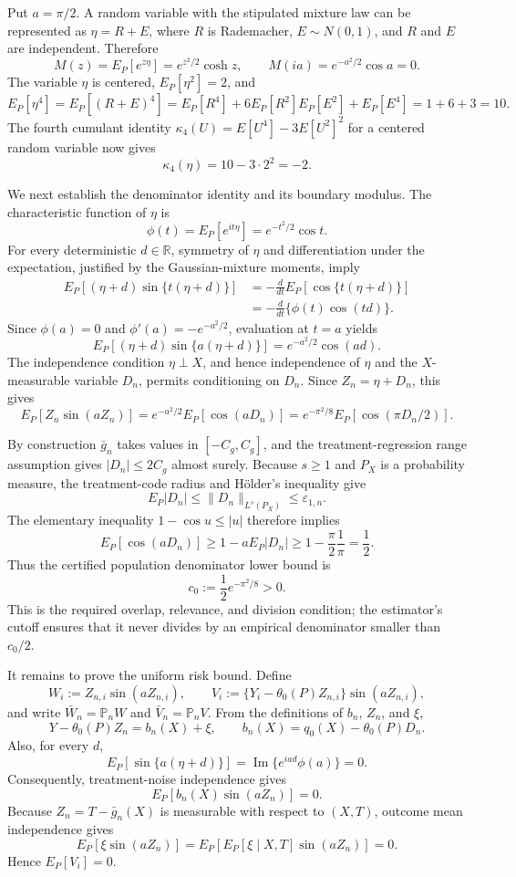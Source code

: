 Put \(a=\pi/2\).  A random variable with the stipulated mixture law can be represented as \(\eta=R+E\), where \(R\) is Rademacher, \(E\sim N(0,1)\), and \(R\) and \(E\) are independent.  Therefore
\[
M(z)=E_P[e^{z\eta}]=e^{z^2/2}\cosh z,
\qquad
M(ia)=e^{-a^2/2}\cos a=0.
\]
The variable \(\eta\) is centered, \(E_P[\eta^2]=2\), and
\[
E_P[\eta^4]
=E_P[(R+E)^4]
=E_P[R^4]+6E_P[R^2]E_P[E^2]+E_P[E^4]
=1+6+3=10.
\]
The fourth cumulant identity \(\kappa_4(U)=E[U^4]-3E[U^2]^2\) for a centered random variable now gives
\[
\kappa_4(\eta)=10-3\cdot 2^2=-2.
\]

We next establish the denominator identity and its boundary modulus.  The characteristic function of \(\eta\) is
\[
\phi(t)=E_P[e^{it\eta}]=e^{-t^2/2}\cos t.
\]
For every deterministic \(d\in\mathbb R\), symmetry of \(\eta\) and differentiation under the expectation, justified by the Gaussian-mixture moments, imply
\[
\begin{aligned}
E_P[(\eta+d)\sin\{t(\eta+d)\}]
&=-\frac{d}{dt}E_P[\cos\{t(\eta+d)\}]\\
&=-\frac{d}{dt}\{\phi(t)\cos(td)\}.
\end{aligned}
\]
Since \(\phi(a)=0\) and \(\phi'(a)=-e^{-a^2/2}\), evaluation at \(t=a\) yields
\[
E_P[(\eta+d)\sin\{a(\eta+d)\}]
=e^{-a^2/2}\cos(ad).
\]
The independence condition \(\eta\perp X\), and hence independence of \(\eta\) and the \(X\)-measurable variable \(D_n\), permits conditioning on \(D_n\).  Since \(Z_n=\eta+D_n\), this gives
\[
E_P[Z_n\sin(aZ_n)]
=e^{-a^2/2}E_P[\cos(aD_n)]
=e^{-\pi^2/8}E_P[\cos(\pi D_n/2)].
\]

By construction \(\bar g_n\) takes values in \([-C_g,C_g]\), and the treatment-regression range assumption gives \(|D_n|\le2C_g\) almost surely.  Because \(s\ge1\) and \(P_X\) is a probability measure, the treatment-code radius and H\"older's inequality give
\[
E_P|D_n|\le \|D_n\|_{L^s(P_X)}\le\varepsilon_{1,n}.
\]
The elementary inequality \(1-\cos u\le |u|\) therefore implies
\[
E_P[\cos(aD_n)]
\ge1-aE_P|D_n|
\ge1-\frac{\pi}{2}\frac1\pi
=\frac12.
\]
Thus the certified population denominator lower bound is
\[
c_0:=\frac12e^{-\pi^2/8}>0.
\]
This is the required overlap, relevance, and division condition; the estimator's cutoff ensures that it never divides by an empirical denominator smaller than \(c_0/2\).

It remains to prove the uniform risk bound.  Define
\[
W_i:=Z_{n,i}\sin(aZ_{n,i}),
\qquad
V_i:=\{Y_i-\theta_0(P)Z_{n,i}\}\sin(aZ_{n,i}),
\]
and write \(\bar W_n=\mathbb P_nW\) and \(\bar V_n=\mathbb P_nV\).  From the definitions of \(b_n\), \(Z_n\), and \(\xi\),
\[
Y-\theta_0(P)Z_n=b_n(X)+\xi,
\qquad
b_n(X)=q_0(X)-\theta_0(P)D_n.
\]
Also, for every \(d\),
\[
E_P[\sin\{a(\eta+d)\}]
=\operatorname{Im}\{e^{iad}\phi(a)\}=0.
\]
Consequently, treatment-noise independence gives
\[
E_P[b_n(X)\sin(aZ_n)]=0.
\]
Because \(Z_n=T-\bar g_n(X)\) is measurable with respect to \((X,T)\), outcome mean independence gives
\[
E_P[\xi\sin(aZ_n)]
=E_P\!\left[E_P[\xi\mid X,T]\sin(aZ_n)\right]=0.
\]
Hence \(E_P[V_i]=0\).

